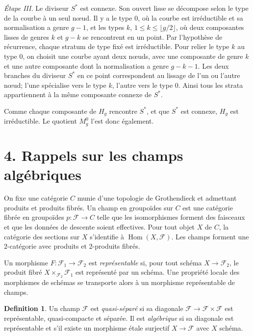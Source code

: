\documentclass[11pt]{article}
\DeclareMathOperator{\Hom}{Hom}
\theoremstyle{plain}
\theoremstyle{definition}
\newtheorem*{definition*}{Definition}
\theoremstyle{remark}
\begin{document}
\emph{Étape III.} Le diviseur \(S^*\) est connexe. Son ouvert lisse se décompose selon le type de la courbe à un seul nœud. Il y a le type \(0\), où la courbe est irréductible et sa normalisation a genre \(g-1\), et les types \(k\), \(1\leq k\leq\lfloor g/2\rfloor\), où deux composantes lisses de genres \(k\) et \(g-k\) se rencontrent en un point. Par l'hypothèse de récurrence, chaque stratum de type fixé est irréductible. Pour relier le type \(k\) au type \(0\), on choisit une courbe ayant deux nœuds, avec une composante de genre \(k\) et une autre composante dont la normalisation a genre \(g-k-1\). Les deux branches du diviseur \(S^*\) en ce point correspondent au lissage de l'un ou l'autre nœud; l'une spécialise vers le type \(k\), l'autre vers le type \(0\). Ainsi tous les strata appartiennent à la même composante connexe de \(S^*\).

Comme chaque composante de \(H_g\) rencontre \(S^*\), et que \(S^*\) est connexe, \(H_g\) est irréductible. Le quotient \(M_g^0\) l'est donc également.

\section*{4. Rappels sur les champs algébriques}

On fixe une catégorie \(C\) munie d'une topologie de Grothendieck et admettant produits et produits fibrés. Un champ en groupoïdes sur \(C\) est une catégorie fibrée en groupoïdes \(p:\mathcal F\to C\) telle que les isomorphismes forment des faisceaux et que les données de descente soient effectives. Pour tout objet \(X\) de \(C\), la catégorie des sections sur \(X\) s'identifie à \(\Hom(X,\mathcal F)\). Les champs forment une \(2\)-catégorie avec produits et \(2\)-produits fibrés.

Un morphisme \(F:\mathcal F_1\to\mathcal F_2\) est \emph{représentable} si, pour tout schéma \(X\to\mathcal F_2\), le produit fibré \(X\times_{\mathcal F_2}\mathcal F_1\) est représenté par un schéma. Une propriété locale des morphismes de schémas se transporte alors à un morphisme représentable de champs.

\begin{definition*}
Un champ \(\mathcal F\) est \emph{quasi-séparé} si sa diagonale \(\mathcal F\to\mathcal F\times\mathcal F\) est représentable, quasi-compacte et séparée. Il est \emph{algébrique} si sa diagonale est représentable et s'il existe un morphisme étale surjectif \(X\to\mathcal F\) avec \(X\) schéma.
\end{definition*}
\end{document}
